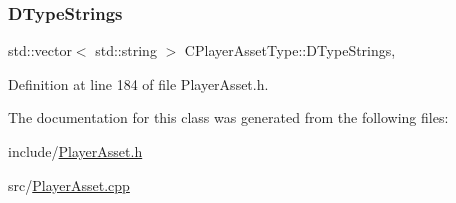 \subsubsection{\texorpdfstring{D\+Type\+Strings}{DTypeStrings}}
{\footnotesize\ttfamily std\+::vector$<$ std\+::string $>$ C\+Player\+Asset\+Type\+::\+D\+Type\+Strings\hspace{0.3cm}{\ttfamily [static]}, {\ttfamily [protected]}}



Definition at line 184 of file Player\+Asset.\+h.



The documentation for this class was generated from the following files\+:\begin{DoxyCompactItemize}
\item 
include/\hyperlink{PlayerAsset_8h}{Player\+Asset.\+h}\item 
src/\hyperlink{PlayerAsset_8cpp}{Player\+Asset.\+cpp}\end{DoxyCompactItemize}

